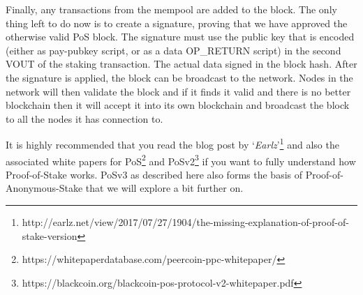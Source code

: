 Finally, any transactions from the mempool are added to the block. The only 
thing left to do now is to create a signature, proving that we have approved 
the otherwise valid PoS block. The signature must use the public key that is 
encoded (either as pay-pubkey script, or as a data OP\_RETURN script) in the 
second VOUT of the staking transaction. The actual data signed in the block 
hash. After the signature is applied, the block can be broadcast to the 
network. Nodes in the network will then validate the block and if it finds 
it valid and there is no better blockchain then it will accept it into its 
own blockchain and broadcast the block to all the nodes it has connection to.



It is highly recommended that you read the blog post by
‘\textit{Earlz}’\footnote{http://earlz.net/view/2017/07/27/1904/the-missing-explanation-of-proof-of-stake-version} 
and also the associated white papers for
PoS\footnote{https://whitepaperdatabase.com/peercoin-ppc-whitepaper/} and
PoSv2\footnote{https://blackcoin.org/blackcoin-pos-protocol-v2-whitepaper.pdf} 
if you want to fully understand how Proof-of-Stake works. PoSv3 as described 
here also forms the basis of Proof-of-Anonymous-Stake that we will explore a 
bit further on.

